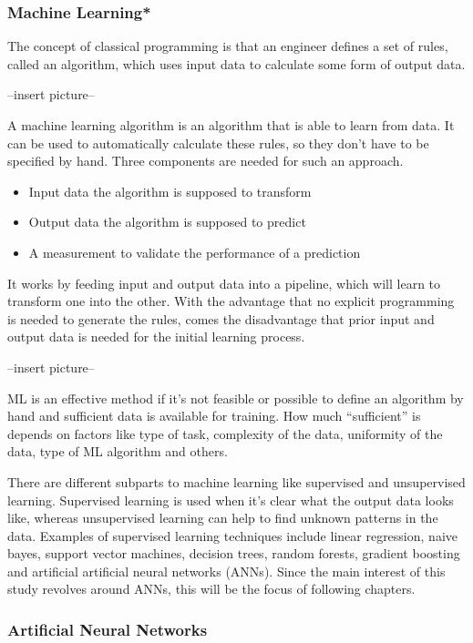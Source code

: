 \subsubsection{Machine Learning*}

The concept of classical programming is that an engineer defines a set of rules, called an algorithm, which uses input data to calculate some form of output data\cite{Chollet2017}.

--insert picture--

A machine learning algorithm is an algorithm that is able to learn from data\cite{Goodfellow2016}. It can be used to automatically calculate these rules, so they don't have to be specified by hand. Three components are needed for such an approach.

\begin{itemize}
\item Input data the algorithm is supposed to transform
\item Output data the algorithm is supposed to predict
\item A measurement to validate the performance of a prediction
\end{itemize}

It works by feeding input and output data into a pipeline, which will learn to transform one into the other. With the advantage that no explicit programming is needed to generate the rules, comes the disadvantage that prior input and output data is needed for the initial learning process.

--insert picture--

ML is an effective method if it's not feasible or possible to define an algorithm by hand and sufficient data is available for training. How much “sufficient” is depends on factors like type of task, complexity of the data, uniformity of the data, type of ML algorithm and others.

There are different subparts to machine learning like supervised and unsupervised learning. Supervised learning is used when it's clear what the output data looks like, whereas unsupervised learning can help to find unknown patterns in the data. Examples of supervised learning techniques include linear regression, naive bayes, support vector machines, decision trees, random forests, gradient boosting and artificial artificial neural networks (ANNs). Since the main interest of this study revolves around ANNs, this will be the focus of following chapters.

\subsubsection{Artificial Neural Networks}

